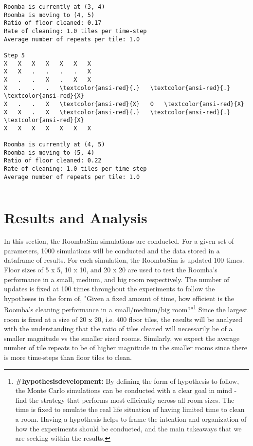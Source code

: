 \documentclass[11pt]{article}
\begin{document}
\begin{Verbatim}[commandchars=\\\{\},fontsize=\footnotesize]
Roomba is currently at (3, 4)
Roomba is moving to (4, 5)
Ratio of floor cleaned: 0.17
Rate of cleaning: 1.0 tiles per time-step
Average number of repeats per tile: 1.0

Step 5
X   X   X   X   X   X   X
X   X   .   .   .   .   X
X   .   .   X   .   X   X
X   .   .   .   \textcolor{ansi-red}{.}   \textcolor{ansi-red}{.}   \textcolor{ansi-red}{X}
X   .   .   X   \textcolor{ansi-red}{X}   O   \textcolor{ansi-red}{X}
X   X   .   X   \textcolor{ansi-red}{.}   \textcolor{ansi-red}{.}   \textcolor{ansi-red}{X}
X   X   X   X   X   X   X

Roomba is currently at (4, 5)
Roomba is moving to (5, 4)
Ratio of floor cleaned: 0.22
Rate of cleaning: 1.0 tiles per time-step
Average number of repeats per tile: 1.0


    \end{Verbatim}
\newpage
    \section{Results and Analysis}

In this section, the RoombaSim simulations are conducted. For a given
set of parameters, 1000 simulations will be conducted and the data
stored in a dataframe of results. For each simulation, the RoombaSim is
updated 100 times.\\

Floor sizes of 5 x 5, 10 x 10, and 20 x 20 are used to test the Roomba's
performance in a small, medium, and big room respectively. The number of
updates is fixed at 100 times throughout the experiments to follow the
hypotheses in the form of, "Given a fixed amount of time, how efficient
is the Roomba's cleaning performance in a small/medium/big room?"\footnote{\textbf{\#hypothesisdevelopment:} By defining the form of hypothesis to follow, the Monte Carlo simulations can be conducted with a clear goal in mind - find the strategy that performs most efficiently across all room sizes. The time is fixed to emulate the real life situation of having limited time to clean a room. Having a hypothesis helps to frame the intention and organization of how the experiments should be conducted, and the main takeaways that we are seeking within the results.} Since
the largest room is fixed at a size of 20 x 20, i.e. 400 floor tiles,
the results will be analyzed with the understanding that the ratio of
tiles cleaned will necessarily be of a smaller magnitude vs the smaller
sized rooms. Similarly, we expect the average number of tile repeats to
be of higher magnitude in the smaller rooms since there is more
time-steps than floor tiles to clean. \\
\end{document}

